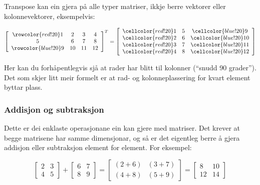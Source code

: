 \documentclass[12pt]{article}
\begin{document}
Transpose kan ein gjera på alle typer matriser, ikkje berre vektorer eller
kolonnevektorer, eksempelvis: 

\begin{equation*}
\left[\begin{array}{cccc}
\rowcolor{red!20}1 & 2 & 3 & 4 \\
5 & 6 & 7 & 8 \\
\rowcolor{blue!20}
9 & 10 & 11 & 12
\end{array}\right]^T = 
\left[\begin{array}{cccc}
\cellcolor{red!20}1 & 5 & \cellcolor{blue!20} 9 \\
\cellcolor{red!20}2 & 6 & \cellcolor{blue!20} 10 \\
\cellcolor{red!20}3 & 7 & \cellcolor{blue!20} 11 \\
\cellcolor{red!20}4 & 8 & \cellcolor{blue!20} 12
\end{array}\right]
\end{equation*}

Her kan du forhåpentlegvis sjå at rader har blitt til kolonner (``snudd 90 grader'').
Det som skjer litt meir formelt er at rad- og 
  kolonneplassering for kvart element byttar plass.

\subsubsection*{Addisjon og subtraksjon}

Dette er dei enklaste operasjonane ein kan gjere med matriser.
Det krever at begge matrisene har samme dimensjonar, og så er det eigentleg
berre å gjera addisjon eller subtraksjon element for element.
For eksempel:

\begin{equation*}
\left[\begin{array}{cccc}
2 & 3 \\
4 & 5 
\end{array}\right] + 
\left[\begin{array}{cccc}
6 & 7 \\ 8 & 9
\end{array}\right] =
\left[\begin{array}{cccc}
(2+6) & (3 + 7) \\
(4+8) & (5 + 9)
\end{array}\right] =
\left[\begin{array}{cccc}
8 & 10 \\
12 & 14
\end{array}\right]
\end{equation*}
\end{document}
